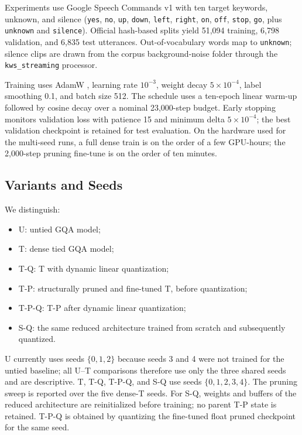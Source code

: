 \documentclass[journal]{IEEEtran}
\begin{document}
Experiments use Google Speech Commands v1 with ten target keywords,
unknown, and silence
(\texttt{yes}, \texttt{no}, \texttt{up}, \texttt{down},
\texttt{left}, \texttt{right}, \texttt{on}, \texttt{off},
\texttt{stop}, \texttt{go}, plus \texttt{unknown} and
\texttt{silence}).
Official hash-based splits yield 51,094 training, 6,798 validation,
and 6,835 test utterances.
Out-of-vocabulary words map to \texttt{unknown}; silence clips are
drawn from the corpus background-noise folder through the
\texttt{kws\_streaming} processor.

Training uses AdamW
\cite{loshchilov2019decoupled},
learning rate $10^{-3}$, weight decay $5\times10^{-4}$,
label smoothing 0.1, and batch size 512.
The schedule uses a ten-epoch linear warm-up followed by
cosine decay over a nominal 23,000-step budget.
Early stopping monitors validation loss with patience 15 and
minimum delta $5\times10^{-4}$; the best validation checkpoint is
retained for test evaluation.
On the hardware used for the multi-seed runs, a full dense train
is on the order of a few GPU-hours; the 2,000-step pruning
fine-tune is on the order of ten minutes.

\subsection{Variants and Seeds}

We distinguish:
\begin{itemize}
  \item U: untied GQA model;
  \item T: dense tied GQA model;
  \item T-Q: T with dynamic linear quantization;
  \item T-P: structurally pruned and fine-tuned T, before
  quantization;
  \item T-P-Q: T-P after dynamic linear quantization;
  \item S-Q: the same reduced architecture trained from scratch
  and subsequently quantized.
\end{itemize}

U currently uses seeds $\{0,1,2\}$ because seeds 3 and 4 were not
trained for the untied baseline; all U--T comparisons therefore use
only the three shared seeds and are descriptive.
T, T-Q, T-P-Q, and S-Q use seeds $\{0,1,2,3,4\}$.
The pruning sweep is reported over the five dense-T seeds.
For S-Q, weights and buffers of the reduced architecture are
reinitialized before training; no parent T-P state is retained.
T-P-Q is obtained by quantizing the fine-tuned float pruned
checkpoint for the same seed.
\end{document}
